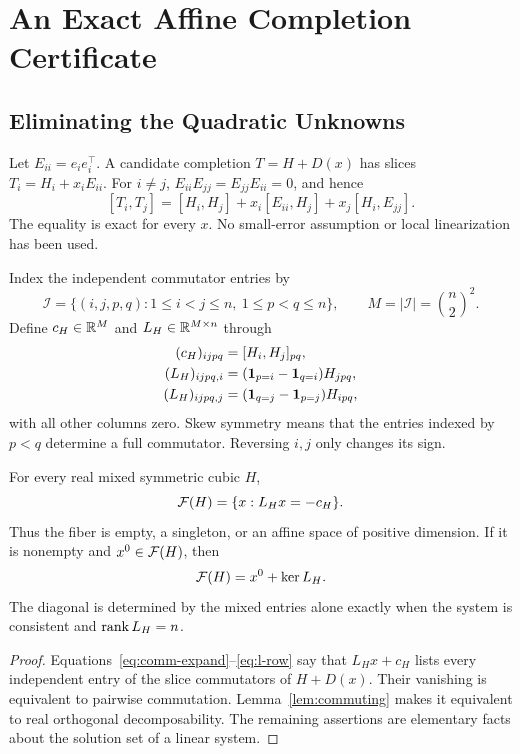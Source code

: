 \section{An Exact Affine Completion Certificate}\label{sec:affine}
\subsection{Eliminating the Quadratic Unknowns}
Let $E_{ii}=e_ie_i^\top$. A candidate completion $T=H+D(x)$ has slices $T_i=H_i+x_iE_{ii}$. For $i\ne j$, $E_{ii}E_{jj}=E_{jj}E_{ii}=0$, and hence
\begin{equation}\label{eq:comm-expand}
 [T_i,T_j]=[H_i,H_j]+x_i[E_{ii},H_j]+x_j[H_i,E_{jj}].
\end{equation}
The equality is exact for every $x$. No small-error assumption or local linearization has been used.

Index the independent commutator entries by
\[
 \mathcal I=\{(i,j,p,q):1\le i<j\le n,\ 1\le p<q\le n\},
 \qquad M=|\mathcal I|=\binom n2^2.
\]
Define $c_H\in\mathbb R^M$ and $L_H\in\mathbb R^{M\times n}$ through
\begin{align}
 (c_H)_{ijpq}&=[H_i,H_j]_{pq},\label{eq:c-row}\\
 (L_H)_{ijpq,i}&=(\mathbf 1_{p=i}-\mathbf 1_{q=i})H_{jpq},\label{eq:l-row}\\
 (L_H)_{ijpq,j}&=(\mathbf 1_{q=j}-\mathbf 1_{p=j})H_{ipq},\nonumber
\end{align}
with all other columns zero. Skew symmetry means that the entries indexed by $p<q$ determine a full commutator. Reversing $i,j$ only changes its sign.

\begin{theorem}\label{thm:affine}
For every real mixed symmetric cubic $H$,
\begin{equation}\label{eq:affine-main}
 \mathcal F(H)=\{x:L_Hx=-c_H\}.
\end{equation}
Thus the fiber is empty, a singleton, or an affine space of positive dimension. If it is nonempty and $x^0\in\mathcal F(H)$, then
\begin{equation}\label{eq:fiber-null}
 \mathcal F(H)=x^0+\ker L_H.
\end{equation}
The diagonal is determined by the mixed entries alone exactly when the system is consistent and $\operatorname{rank} L_H=n$.
\end{theorem}
\begin{proof}
Equations~\eqref{eq:comm-expand}--\eqref{eq:l-row} say that $L_Hx+c_H$ lists every independent entry of the slice commutators of $H+D(x)$. Their vanishing is equivalent to pairwise commutation. Lemma~\ref{lem:commuting} makes it equivalent to real orthogonal decomposability. The remaining assertions are elementary facts about the solution set of a linear system.
\end{proof}

